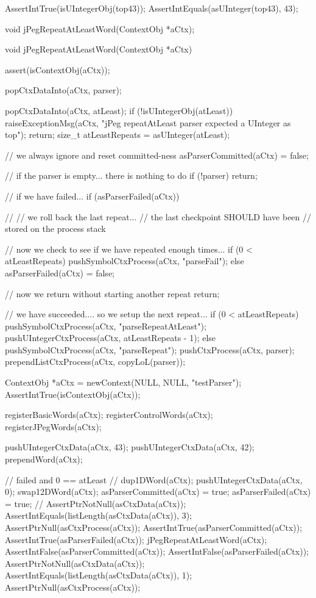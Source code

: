   AssertIntTrue(isUIntegerObj(top43));
  AssertIntEquals(asUInteger(top43), 43);  
\stopCTest
\stopTestCase
\stopTestSuite

\startTestSuite[jPegRepeatAtLeastWord]

\startCHeader
void jPegRepeatAtLeastWord(ContextObj *aCtx);
\stopCHeader

\startCCode
void jPegRepeatAtLeastWord(ContextObj *aCtx) {
  assert(isContextObj(aCtx));
  
  popCtxDataInto(aCtx, parser);

  popCtxDataInto(aCtx, atLeast);
  if (!isUIntegerObj(atLeast)) {
    raiseExceptionMsg(aCtx,
      "jPeg repeatAtLeast parser expected a UInteger as top");
    return;
  }
  size_t atLeastRepeats = asUInteger(atLeast);
  
  // we always ignore and reset committed-ness
  asParserCommitted(aCtx) = false;

  // if the parser is empty... there is nothing to do
  if (!parser) return;
  
  // if we have failed...
  if (asParserFailed(aCtx)) {
    //
    // we roll back the last repeat...
    // the last checkpoint SHOULD have been
    // stored on the process stack
    
    // now we check to see if we have repeated enough times...
    if (0 < atLeastRepeats) {
      pushSymbolCtxProcess(aCtx, "parseFail");
    } else {
      asParserFailed(aCtx) = false;
    }
    
    // now we return without starting another repeat
    return;
  }
  
  // we have succeeded.... so we setup the next repeat...
  if (0 < atLeastRepeats) {
    pushSymbolCtxProcess(aCtx, "parseRepeatAtLeast");
    pushUIntegerCtxProcess(aCtx, atLeastRepeats - 1);
  } else {
    pushSymbolCtxProcess(aCtx, "parseRepeat");
  }
  pushCtxProcess(aCtx, parser);
  prependListCtxProcess(aCtx, copyLoL(parser));
}
\stopCCode


\startCTest
  ContextObj *aCtx = newContext(NULL, NULL, "testParser");
  AssertIntTrue(isContextObj(aCtx));
  
  registerBasicWords(aCtx);
  registerControlWords(aCtx);
  registerJPegWords(aCtx);
  
  pushUIntegerCtxData(aCtx, 43);
  pushUIntegerCtxData(aCtx, 42);
  prependWord(aCtx);

  // failed and 0 == atLeast
  //
  dup1DWord(aCtx);
  pushUIntegerCtxData(aCtx, 0);
  swap12DWord(aCtx);
  asParserCommitted(aCtx) = true;
  asParserFailed(aCtx) = true;
  //
  AssertPtrNotNull(asCtxData(aCtx));
  AssertIntEquals(listLength(asCtxData(aCtx)), 3);
  AssertPtrNull(asCtxProcess(aCtx));
  AssertIntTrue(asParserCommitted(aCtx));
  AssertIntTrue(asParserFailed(aCtx));
  jPegRepeatAtLeastWord(aCtx);
  AssertIntFalse(asParserCommitted(aCtx));
  AssertIntFalse(asParserFailed(aCtx));
  AssertPtrNotNull(asCtxData(aCtx));
  AssertIntEquals(listLength(asCtxData(aCtx)), 1);
  AssertPtrNull(asCtxProcess(aCtx));


